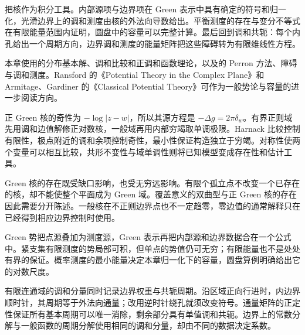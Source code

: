 \ProseParagraphBreak
{}把核作为积分工具。内部源项与边界项在 Green 表示中具有确定的符号和归一化，光滑边界上的调和测度由核的外法向导数给出。平衡测度的存在与变分不等式在有限能量范围内证明，圆盘中的容量可以完整计算。最后回到调和共轭：每个内孔给出一个周期方向，边界调和测度的能量矩阵把这些障碍转为有限维线性方程。

\ProseParagraphBreak
本章使用的分布基本解、调和比较和正调和函数理论，以及的 Perron 方法、障碍与调和测度。Ransford 的《Potential Theory in the Complex Plane》\cite{Ransford1995Potential}和 Armitage、Gardiner 的《Classical Potential Theory》\cite{Armitage2001Classical}可作为一般势论与容量的进一步阅读方向。







\begin{chaptersummary}
正 Green 核的奇性为 \(-\log|z-w|\)，所以其源方程是 \(-\Delta g=2\pi\delta_w\)。有界正则域先用调和边值解修正对数核，一般域再用内部穷竭取单调极限。Harnack 比较控制有限性，极点附近的调和余项控制奇性，最小性保证构造独立于穷竭。对称性使两个变量可以相互比较，共形不变性与域单调性则将已知模型变成存在性和估计工具。

\ProseParagraphBreak
Green 核的存在既受缺口影响，也受无穷远影响。有限个孤立点不改变一个已存在的核，却不能使整个平面成为 Green 域。覆盖意义的双曲型与正 Green 核的存在因此需要分开陈述。一般核在不正则边界点也不一定趋零，零边值的通常解释只在已经得到相应边界控制时使用。

\ProseParagraphBreak
Green 势把点源叠加为测度源，Green 表示再把内部源和边界数据合在一个公式中。紧支集有限测度的势局部可积，但单点的势值仍可无穷；有限能量也不是处处有界的保证。概率测度的最小能量决定本章归一化下的容量，圆盘算例明确给出它的对数尺度。

\ProseParagraphBreak
有限连通域的调和分量同时记录边界权重与共轭周期。沿区域正向行进时，内边界顺时针，其周期等于外法向通量；改用逆时针绕孔就须改变符号。通量矩阵的正定性保证所有基本周期可以唯一消除，剩余部分具有单值调和共轭。边界上的常数分解与一般函数的周期分解使用相同的调和分量，却由不同的数据决定系数。
\end{chaptersummary}

\BookExercises


